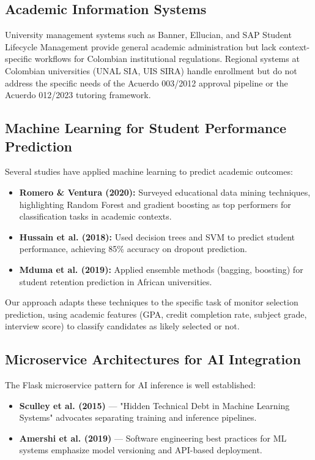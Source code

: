 \documentclass[12pt,a4paper]{article}
\begin{document}
\subsection{Academic Information Systems}
University management systems such as Banner, Ellucian, and SAP Student Lifecycle Management
provide general academic administration but lack context-specific workflows for Colombian
institutional regulations. Regional systems at Colombian universities (UNAL SIA, UIS SIRA)
handle enrollment but do not address the specific needs of the Acuerdo 003/2012 approval
pipeline or the Acuerdo 012/2023 tutoring framework.

\subsection{Machine Learning for Student Performance Prediction}
Several studies have applied machine learning to predict academic outcomes:
\begin{itemize}
  \item \textbf{Romero \& Ventura (2020):} Surveyed educational data mining techniques,
        highlighting Random Forest and gradient boosting as top performers for classification
        tasks in academic contexts.
  \item \textbf{Hussain et al. (2018):} Used decision trees and SVM to predict student
        performance, achieving 85\% accuracy on dropout prediction.
  \item \textbf{Mduma et al. (2019):} Applied ensemble methods (bagging, boosting) for
        student retention prediction in African universities.
\end{itemize}

Our approach adapts these techniques to the specific task of monitor selection prediction,
using academic features (GPA, credit completion rate, subject grade, interview score) to
classify candidates as likely selected or not.

\subsection{Microservice Architectures for AI Integration}
The Flask microservice pattern for AI inference is well established:
\begin{itemize}
  \item \textbf{Sculley et al. (2015)} — "Hidden Technical Debt in Machine Learning Systems"
        advocates separating training and inference pipelines.
  \item \textbf{Amershi et al. (2019)} — Software engineering best practices for ML systems
        emphasize model versioning and API-based deployment.
\end{itemize}
\end{document}
